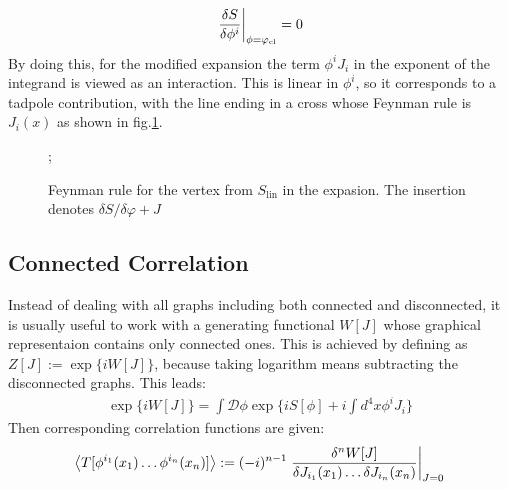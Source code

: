 \begin{align}
    \eval{\fdv{S}{\phi ^{i}}}_{\phi = \varphi _{\text{cl}}} = 0
\end{align}
By doing this, for the modified expansion the term $\phi^{i} J_{i}$ in the exponent of the integrand is viewed as an interaction. This is linear in $\phi ^{i}$, so it corresponds to a tadpole contribution, with the line ending in a cross whose Feynman rule is $J_{i}(x)$ as shown in fig.\ref{fig:tadpole}.
\begin{figure}[h]
    \centering
    ;
    \caption{Feynman rule for the vertex from $S_{\text{lin}}$ in the expasion. The insertion denotes $\delta S / \delta \varphi + J$}
    \label{fig:tadpole}
\end{figure}

\subsection{Connected Correlation}
Instead of dealing with all graphs including both connected and disconnected, it is usually useful to work with a generating functional $W[J]$ whose graphical representaion contains only connected ones. This is achieved by defining as $Z[J] := \exp \lbrace iW[J] \rbrace$, because taking logarithm means subtracting the disconnected graphs. This leads:
\begin{align}
    \label{eq:W}
    \exp \lbrace iW[J] \rbrace = \int \mathcal{D} \phi \exp \lbrace iS[\phi] + i\int d^{4}x \phi ^{i} J_{i} \rbrace 
\end{align}
Then corresponding correlation functions are given:
\begin{align}
    \expval{T[\phi ^{i_{1}}(x_{1}) \dots \phi ^{i_{n}}(x_{n}) ]} := (-i)^{n-1} \eval{\frac{\delta ^{n}W[J]}{\delta J_{i_{1}}(x_{1}) \dots \delta J_{i_{n}}(x_{n})}} _{J=0}
\end{align}

